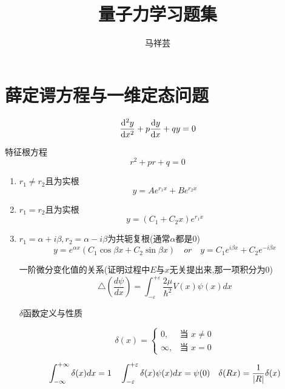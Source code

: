 \documentclass{article}
\title{量子力学习题集}
\author{马祥芸}
\begin{document}
    \maketitle
    \tableofcontents
    \newpage

    \section{薛定谔方程与一维定态问题}

        \begin{formal}
            $$ \dv[2]{y}{x} + p\dv{y}{x} + qy = 0 $$
            
            特征根方程
            $$ r^{2} + pr + q = 0 $$

            \begin{enumerate}
                \item $r_{1} \neq r_{2}$且为实根
                $$ y = Ae^{r_{1}x} + Be^{r_{2}x} $$
                \item $r_{1} = r_{2}$且为实根
                $$ y = (C_{1}+C_{2}x)e^{r_{1}x} $$
                \item $r_{1}=\alpha + i \beta,r_{2} = \alpha - i \beta $为共轭复根(通常$\alpha$都是0)
                $$ y = e^{\alpha x} (C_{1}\cos{\beta x} + C_{2}\sin{\beta x}) \quad or \quad y = C_{1}e^{i\beta x} + C_{2}e^{-i\beta x}$$

                一阶微分变化值的关系(证明过程中$E$与$x$无关提出来,那一项积分为0)
                $$ \triangle(\frac{d\psi}{dx}) = \int_{-\varepsilon}^{+\varepsilon}\frac{2\mu}{\hbar^2}V(x)\psi(x)dx $$    

                $\delta$函数定义与性质

                $$
                \delta(x) = 
                    \begin{cases}
                        0, & \text{当 } x \neq 0 \\
                        \infty, & \text{当 } x = 0
                    \end{cases}
                $$



                $$
                \int_{-\infty}^{+\infty} \delta(x) dx =1
                \quad
                \int_{-\varepsilon}^{+\varepsilon} \delta(x) \psi(x) dx =\psi(0) 
                \quad 
                \delta(Rx) = \frac{1}{\abs{R}} \delta(x) 
                $$


\end{enumerate}
\end{formal}
\end{document}
